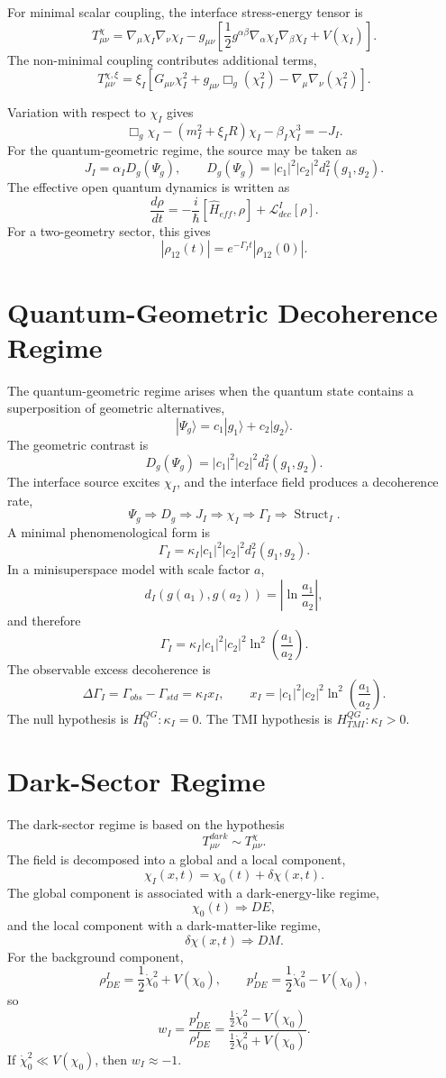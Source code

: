 \documentclass[12pt,a4paper]{article}
\DeclareMathOperator{\Struct}{Struct}
\begin{document}
For minimal scalar coupling, the interface stress-energy tensor is
\[
\boxed{
T_{\mu\nu}^{\chi}
=
\nabla_\mu\chi_I\nabla_\nu\chi_I
-g_{\mu\nu}\left[\frac12 g^{\alpha\beta}\nabla_\alpha\chi_I\nabla_\beta\chi_I+V(\chi_I)\right].
}
\]
The non-minimal coupling contributes additional terms,
\[
\boxed{
T_{\mu\nu}^{\chi,\xi}
=\xi_I\left[G_{\mu\nu}\chi_I^2+g_{\mu\nu}\Box_g(\chi_I^2)-\nabla_\mu\nabla_\nu(\chi_I^2)\right].
}
\]

Variation with respect to $\chi_I$ gives
\[
\boxed{
\Box_g\chi_I-(m_I^2+\xi_I R)\chi_I-\beta_I\chi_I^3=-J_I.
}
\]
For the quantum-geometric regime, the source may be taken as
\[
\boxed{
J_I=\alpha_I D_g(\Psi_g),
\qquad
D_g(\Psi_g)=|c_1|^2|c_2|^2d_I^2(g_1,g_2).
}
\]
The effective open quantum dynamics is written as
\[
\boxed{
\frac{d\rho}{dt}=-\frac{i}{\hbar}[\widehat H_{eff},\rho]+\mathcal L_{dec}^{I}[\rho].
}
\]
For a two-geometry sector, this gives
\[
\boxed{|\rho_{12}(t)|=e^{-\Gamma_I t}|\rho_{12}(0)|.}
\]

\section{Quantum-Geometric Decoherence Regime}
The quantum-geometric regime arises when the quantum state contains a superposition of geometric alternatives,
\[
|\Psi_g\rangle=c_1|g_1\rangle+c_2|g_2\rangle.
\]
The geometric contrast is
\[
\boxed{
D_g(\Psi_g)=|c_1|^2|c_2|^2d_I^2(g_1,g_2).
}
\]
The interface source excites $\chi_I$, and the interface field produces a decoherence rate,
\[
\boxed{
\Psi_g\Rightarrow D_g\Rightarrow J_I\Rightarrow \chi_I\Rightarrow \Gamma_I\Rightarrow \Struct_I.
}
\]
A minimal phenomenological form is
\[
\boxed{
\Gamma_I=\kappa_I|c_1|^2|c_2|^2d_I^2(g_1,g_2).
}
\]
In a minisuperspace model with scale factor $a$,
\[
\boxed{
d_I(g(a_1),g(a_2))=\left|\ln\frac{a_1}{a_2}\right|,
}
\]
and therefore
\[
\boxed{
\Gamma_I=\kappa_I|c_1|^2|c_2|^2\ln^2\left(\frac{a_1}{a_2}\right).
}
\]
The observable excess decoherence is
\[
\boxed{
\Delta\Gamma_I=\Gamma_{obs}-\Gamma_{std}=\kappa_I x_I,
\qquad
x_I=|c_1|^2|c_2|^2\ln^2\left(\frac{a_1}{a_2}\right).
}
\]
The null hypothesis is $H_0^{QG}:\kappa_I=0$. The TMI hypothesis is $H_{TMI}^{QG}:\kappa_I>0$.

\section{Dark-Sector Regime}
The dark-sector regime is based on the hypothesis
\[
\boxed{
T_{\mu\nu}^{dark}\sim T_{\mu\nu}^{\chi}.
}
\]
The field is decomposed into a global and a local component,
\[
\boxed{\chi_I(x,t)=\chi_0(t)+\delta\chi(x,t).}
\]
The global component is associated with a dark-energy-like regime,
\[
\boxed{\chi_0(t)\Rightarrow DE,}
\]
and the local component with a dark-matter-like regime,
\[
\boxed{\delta\chi(x,t)\Rightarrow DM.}
\]
For the background component,
\[
\boxed{
\rho_{DE}^{I}=\frac12\dot\chi_0^2+V(\chi_0),
\qquad
p_{DE}^{I}=\frac12\dot\chi_0^2-V(\chi_0),
}
\]
so
\[
\boxed{
w_I=\frac{p_{DE}^{I}}{\rho_{DE}^{I}}
=\frac{\frac12\dot\chi_0^2-V(\chi_0)}{\frac12\dot\chi_0^2+V(\chi_0)}.
}
\]
If $\dot\chi_0^2\ll V(\chi_0)$, then $w_I\approx -1$.
\end{document}
